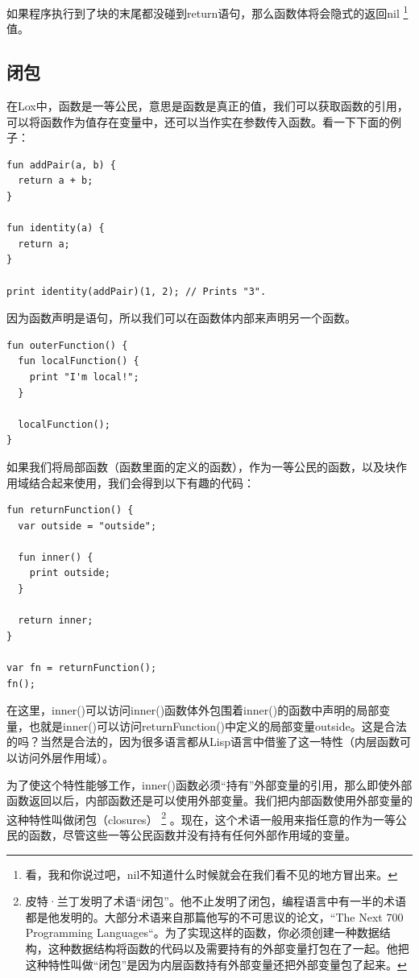 \documentclass[cn,10pt,math=newtx,citestyle=gb7714-2015,bibstyle=gb7714-2015]{elegantbook}
\begin{document}
如果程序执行到了块的末尾都没碰到return语句，那么函数体将会隐式的返回nil \footnote{看，我和你说过吧，nil不知道什么时候就会在我们看不见的地方冒出来。} 值。

\subsection{闭包}

在Lox中，函数是一等公民，意思是函数是真正的值，我们可以获取函数的引用，可以将函数作为值存在变量中，还可以当作实在参数传入函数。看一下下面的例子：

\begin{verbatim}
fun addPair(a, b) {
  return a + b;
}

fun identity(a) {
  return a;
}

print identity(addPair)(1, 2); // Prints "3".
\end{verbatim}

因为函数声明是语句，所以我们可以在函数体内部来声明另一个函数。

\begin{verbatim}
fun outerFunction() {
  fun localFunction() {
    print "I'm local!";
  }

  localFunction();
}
\end{verbatim}

如果我们将局部函数（函数里面的定义的函数），作为一等公民的函数，以及块作用域结合起来使用，我们会得到以下有趣的代码：

\begin{verbatim}
fun returnFunction() {
  var outside = "outside";

  fun inner() {
    print outside;
  }

  return inner;
}

var fn = returnFunction();
fn();
\end{verbatim}

在这里，inner()可以访问inner()函数体外包围着inner()的函数中声明的局部变量，也就是inner()可以访问returnFunction()中定义的局部变量outside。这是合法的吗？当然是合法的，因为很多语言都从Lisp语言中借鉴了这一特性（内层函数可以访问外层作用域）。

为了使这个特性能够工作，inner()函数必须“持有”外部变量的引用，那么即使外部函数返回以后，内部函数还是可以使用外部变量。我们把内部函数使用外部变量的这种特性叫做闭包（closures） \footnote{皮特·兰丁发明了术语“闭包”。他不止发明了闭包，编程语言中有一半的术语都是他发明的。大部分术语来自那篇他写的不可思议的论文，“The Next 700 Programming Languages“。为了实现这样的函数，你必须创建一种数据结构，这种数据结构将函数的代码以及需要持有的外部变量打包在了一起。他把这种特性叫做“闭包”是因为内层函数持有外部变量还把外部变量包了起来。} 。现在，这个术语一般用来指任意的作为一等公民的函数，尽管这些一等公民函数并没有持有任何外部作用域的变量。
\end{document}
